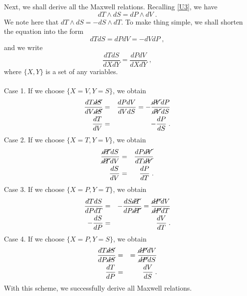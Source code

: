 \documentclass[12pt]{article}
\numberwithin{equation}{section}
\theoremstyle{remark}
\theoremstyle{definition}
\newcommand{\nn}{\nonumber}
\begin{document}
\\
\\
Next, we shall derive all the Maxwell relations. Recalling \eqref{U3}, we have 
\begin{equation}
    dT\wedge dS=dP\wedge dV\;.
\end{equation}
We note here that $dT\wedge dS=-dS\wedge dT$. To make thing simple, we shall shorten the equation into the form
\begin{equation}
    dTdS=dPdV=-dVdP\;,
\end{equation}
and we write
\begin{equation}
    \frac{dTdS}{dXdY}=\frac{dPdV}{dXdY}\;,
\end{equation}
where $\{X,Y\}$ is a set of any variables.
\\
\\
Case 1. If we choose $\{X=V,Y=S\}$, we obtain
\begin{eqnarray}\label{MW1}
    \frac{dT\cancel{dS}}{dV\cancel{dS}}&=&\frac{dPdV}{dVdS}=-\frac{\cancel{dV}dP}{\cancel{dV}dS}\nn\\
    \frac{dT}{dV}&=&-\frac{dP}{dS}\;.
\end{eqnarray}
Case 2. If we choose $\{X=T,Y=V\}$, we obtain
\begin{eqnarray}\label{MW2}
    \frac{\cancel{dT}dS}{\cancel{dT}dV}&=&\frac{dP\cancel{dV}}{dT\cancel{dV}}\nn\\
    \frac{dS}{dV}&=&\frac{dP}{dT}\;.
\end{eqnarray}
Case 3. If we choose $\{X=P,Y=T\}$, we obtain
\begin{eqnarray}\label{MW3}
    \frac{dTdS}{dPdT}&=&-\frac{dS\cancel{dT}}{dP\cancel{dT}}=\frac{\cancel{dP}dV}{\cancel{dP}dT}\nn\\
    -\frac{dS}{dP}&=&\frac{dV}{dT}\;.
\end{eqnarray}
Case 4. If we choose $\{X=P,Y=S\}$, we obtain
\begin{eqnarray}\label{MW4}
    \frac{dT\cancel{dS}}{dP\cancel{dS}}&=&=\frac{\cancel{dP}dV}{\cancel{dP}dS}\nn\\
    \frac{dT}{dP}&=&\frac{dV}{dS}\;.
\end{eqnarray}
With this scheme, we successfully derive all Maxwell relations.
%
%
%
\end{document}
